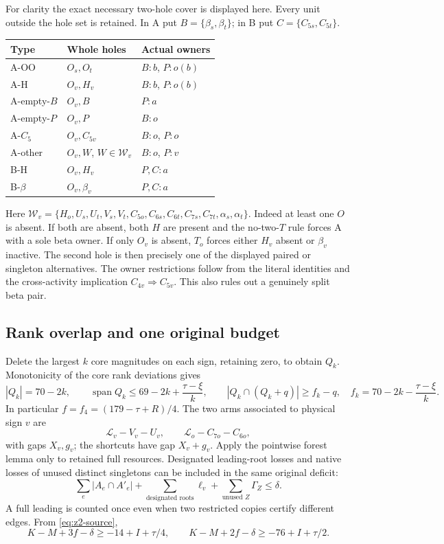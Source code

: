 \documentclass[11pt,letterpaper]{article}
\theoremstyle{definition}\newtheorem{definition}[theorem]{Definition}
\begin{document}
For clarity the exact necessary two-hole cover is displayed here. Every unit outside the hole set is retained. In A put $B=\{\beta_s,\beta_t\}$; in B put $C=\{C_{5s},C_{5t}\}$.
\begin{center}\small
\begin{tabular}{lll}
Type&Whole holes&Actual owners\\\hline
A-OO&$O_s,O_t$&$B:b$, $P:o(b)$\\
A-H&$O_v,H_v$&$B:b$, $P:o(b)$\\
A-empty-$B$&$O_v,B$&$P:a$\\
A-empty-$P$&$O_v,P$&$B:o$\\
A-$C_5$&$O_v,C_{5v}$&$B:o$, $P:o$\\
A-other&$O_v,W$, $W\in\mathcal W_v$&$B:o$, $P:v$\\
B-H&$O_v,H_v$&$P,C:a$\\
B-$\beta$&$O_v,\beta_v$&$P,C:a$
\end{tabular}
\end{center}
Here $\mathcal W_v=\{H_o,U_s,U_t,V_s,V_t,C_{5o},C_{6s},C_{6t},C_{7s},C_{7t},\alpha_s,\alpha_t\}$.
Indeed at least one $O$ is absent. If both are absent, both $H$ are present and the no-two-$T$ rule forces A with a sole beta owner. If only $O_v$ is absent, $T_o$ forces either $H_v$ absent or $\beta_v$ inactive. The second hole is then precisely one of the displayed paired or singleton alternatives. The owner restrictions follow from the literal identities and the cross-activity implication $C_{4v}\Rightarrow C_{5v}$. This also rules out a genuinely split beta pair.

\subsection{Rank overlap and one original budget}
Delete the largest $k$ core magnitudes on each sign, retaining zero, to obtain $Q_k$. Monotonicity of the core rank deviations gives
\[
 |Q_k|=70-2k,\qquad \operatorname{span}Q_k\le69-2k+\frac{\tau-\xi}{k},\qquad
 |Q_k\cap(Q_k+q)|\ge f_k-q,
 \quad f_k=70-2k-\frac{\tau-\xi}{k}.
\]
In particular $f=f_4=(179-\tau+R)/4$.
The two arms associated to physical sign $v$ are
\[
 \mathcal L_v-V_v-U_v,\qquad \mathcal L_o-C_{7o}-C_{6o},
\]
with gaps $X_v,g_v$; the shortcuts have gap $X_v+g_v$.
Apply the pointwise forest lemma only to retained full resources. Designated leading-root losses and native losses of unused distinct singletons can be included in the same original deficit:
\begin{equation}\label{eq:z2-rooted}
 \sum_{e}|A_e\cap A'_e|+\sum_{\text{designated roots}}\ell_v+
 \sum_{\text{unused }Z}\Gamma_Z\le\delta.
\end{equation}
A full leading is counted once even when two restricted copies certify different edges. From \eqref{eq:z2-source},
\begin{equation}\label{eq:z2-fbounds}
 K-M+3f-\delta\ge-14+I+\tau/4,\qquad
 K-M+2f-\delta\ge-76+I+\tau/2.
\end{equation}
\end{document}

